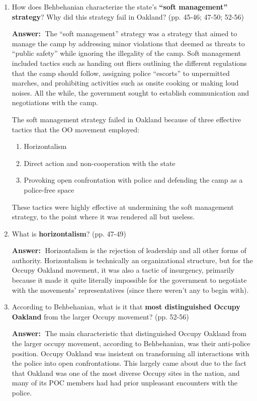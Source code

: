 \documentclass{article}
\newcommand{\answer}{\textbf{Answer:}$\;$}
\begin{document}
\begin{enumerate}[label=\arabic*)]
    \item How does Behbehanian characterize the state's \textbf{``soft management'' strategy}?
    Why did this strategy fail in Oakland? (pp. 45-46; 47-50; 52-56)
   
    \answer
    The ``soft management'' strategy was a strategy that aimed to manage the camp by addressing minor violations that deemed as threats to ``public safety'' while ignoring the illegality of the camp.
    Soft management included tactics such as handing out fliers outlining the different regulations that the camp should follow, assigning police ``escorts'' to unpermitted marches, and prohibiting activities such as onsite cooking or making loud noises.
    All the while, the government sought to establish communication and negotiations with the camp.

    The soft management strategy failed in Oakland because of three effective tactics that the OO movement employed: 
    \begin{enumerate}
        \item Horizontalism
        \item Direct action and non-cooperation with the state
        \item Provoking open confrontation with police and defending the camp as a police-free space
    \end{enumerate}
    These tactics were highly effective at undermining the soft management strategy, to the point where it was rendered all but useless.
    
    \item What is \textbf{horizontalism}? (pp. 47-49)
    
    \answer 
    Horizontalism is the rejection of leadership and all other forms of authority.
    Horizontalism is technically an organizational structure, but for the Occupy Oakland movement, it was also a tactic of insurgency, primarily because it made it quite literally impossible for the government to negotiate with the movements' representatives (since there weren't any to begin with).
     
    \item According to Behbehanian, what is it that \textbf{most distinguished Occupy Oakland} from the larger Occupy movement? (pp. 52-56) 
    
    \answer
    The main characteristic that distinguished Occupy Oakland from the larger occupy movement, according to Behbehanian, was their anti-police position.
    Occupy Oakland was insistent on transforming all interactions with the police into open confrontations.
    This largely came about due to the fact that Oakland was one of the most diverse Occupy sites in the nation, and many of its POC members had had prior unpleasant encounters with the police.


\end{enumerate}
\end{document}
